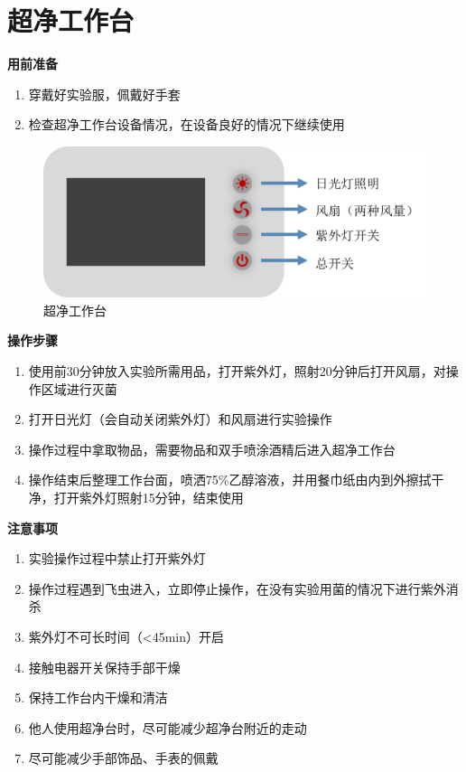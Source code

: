 \documentclass[
]{book}
\providecommand{\tightlist}{%
  \setlength{\itemsep}{0pt}\setlength{\parskip}{0pt}}
\begin{document}
\hypertarget{ux8d85ux51c0ux5de5ux4f5cux53f0}{%
\section{超净工作台}\label{ux8d85ux51c0ux5de5ux4f5cux53f0}}

\textbf{用前准备}

\begin{enumerate}
\def\labelenumi{\arabic{enumi}.}
\tightlist
\item
  穿戴好实验服，佩戴好手套
\item
  检查超净工作台设备情况，在设备良好的情况下继续使用
\end{enumerate}

\begin{figure}

{\centering \includegraphics[width=0.5\linewidth]{images/超净工作台} 

}

\caption{超净工作台}\label{fig:unnamed-chunk-1}
\end{figure}

\textbf{操作步骤}

\begin{enumerate}
\def\labelenumi{\arabic{enumi}.}
\tightlist
\item
  使用前30分钟放入实验所需用品，打开紫外灯，照射20分钟后打开风扇，对操作区域进行灭菌
\item
  打开日光灯（会自动关闭紫外灯）和风扇进行实验操作
\item
  操作过程中拿取物品，需要物品和双手喷涂酒精后进入超净工作台
\item
  操作结束后整理工作台面，喷洒75\%乙醇溶液，并用餐巾纸由内到外擦拭干净，打开紫外灯照射15分钟，结束使用
\end{enumerate}

\textbf{注意事项}

\begin{enumerate}
\def\labelenumi{\arabic{enumi}.}
\tightlist
\item
  实验操作过程中禁止打开紫外灯
\item
  操作过程遇到飞虫进入，立即停止操作，在没有实验用菌的情况下进行紫外消杀
\item
  紫外灯不可长时间（\textless45min）开启
\item
  接触电器开关保持手部干燥
\item
  保持工作台内干燥和清洁
\item
  他人使用超净台时，尽可能减少超净台附近的走动
\item
  尽可能减少手部饰品、手表的佩戴
\end{enumerate}
\end{document}
